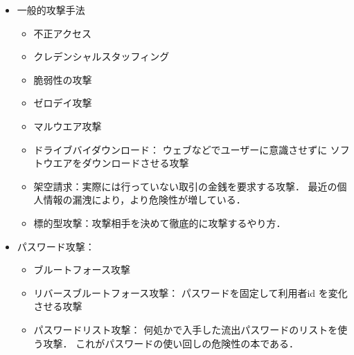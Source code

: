    \begin{itemize}   
    \item
      一般的攻撃手法
         \begin{itemize}  
             \item       
               不正アクセス
            \item    
               クレデンシャルスタッフィング
            \item    
               脆弱性の攻撃
            \item    
               ゼロデイ攻撃
            \item    
               マルウエア攻撃
            \item    
               ドライブバイダウンロード：
               ウェブなどでユーザーに意識させずに
               ソフトウエアをダウンロードさせる攻撃
            \item    
               架空請求：実際には行っていない取引の金銭を要求する攻撃．
               最近の個人情報の漏洩により，より危険性が増している．
            \item
                標的型攻撃：攻撃相手を決めて徹底的に攻撃するやり方．
        \end{itemize}
     \item
         パスワード攻撃：
         \begin{itemize}
            \item
               ブルートフォース攻撃
            \item
               リバースブルートフォース攻撃：
               パスワードを固定して利用者id を変化させる攻撃
            \item
              パスワードリスト攻撃：
              何処かで入手した流出パスワードのリストを使う攻撃．
              これがパスワードの使い回しの危険性の本である．
              

\end{itemize}
\end{itemize}
